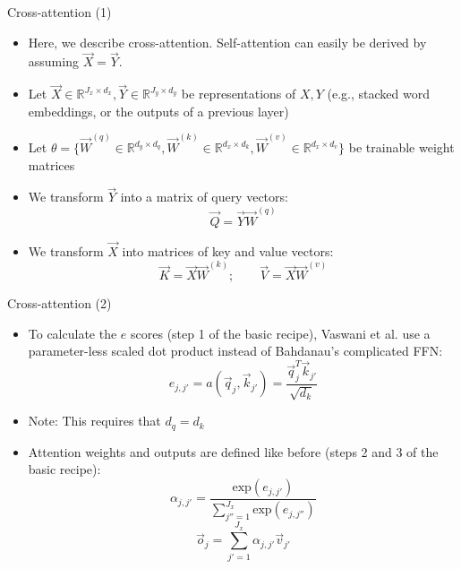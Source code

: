 \begin{vbframe}{Cross-attention (1)}

\vfill

\begin{itemize}
	\item Here, we describe cross-attention. Self-attention can easily be derived by assuming $\vec X = \vec Y$. 
	\item Let $\vec X \in \mathbb{R}^{J_x \times d_x}, \vec Y \in \mathbb{R}^{J_y \times d_y}$ be representations of $X, Y$ (e.g., stacked word embeddings, or the outputs of a previous layer)
	\item Let $\theta = \{\vec W^{(q)} \in \mathbb{R}^{d_y \times d_q}, \vec W^{(k)} \in \mathbb{R}^{d_x \times d_k}, \vec W^{(v)} \in \mathbb{R}^{d_x \times d_v}\}$ be trainable weight matrices
	\item We transform $\vec Y$ into a matrix of query vectors:
	$$ \vec Q = \vec Y \vec W^{(q)} $$
	\item We transform $\vec X$ into matrices of key and value vectors:
	$$ \vec K = \vec X \vec W^{(k)} ; \qquad \vec V =  \vec X \vec W^{(v)}$$
\end{itemize}

\vfill

\end{vbframe}


\begin{vbframe}{Cross-attention (2)}

\vfill

\begin{itemize}
	\item To calculate the $e$ scores (step 1 of the basic recipe), Vaswani et al. use a parameter-less scaled dot product instead of Bahdanau's complicated FFN:
	$$ e_{j,j'} = a(\vec q_j, \vec k_{j'}) = \frac{\vec q_j^T \vec k_{j'}}{\sqrt{d_k}} $$
	\item Note: This requires that $d_q = d_k$
	\item Attention weights and outputs are defined like before (steps 2 and 3 of the basic recipe):
	$$ \alpha_{j,j'} = \frac{\mathrm{exp}(e_{j,j'})}{\sum_{j'' = 1}^{J_x} \mathrm{exp}(e_{j,j''})}$$
	$$ \vec o_j = \sum_{j'=1}^{J_x} \alpha_{j,j'} \vec v_{j'}$$
\end{itemize}

\vfill

\end{vbframe}

